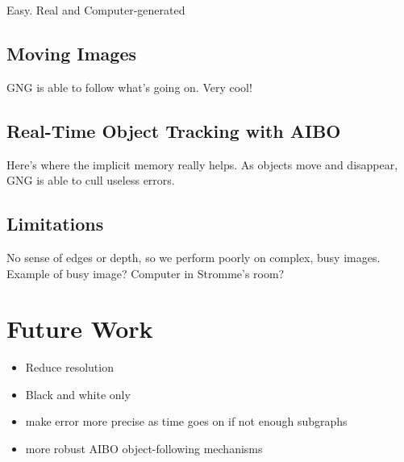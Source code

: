 \documentclass{article}
\renewcommand{\|}{\origbar} %
\begin{document}
Easy. Real and Computer-generated

\subsection{Moving Images}

GNG is able to follow what's going on. Very cool!

\subsection{Real-Time Object Tracking with AIBO}

Here's where the implicit memory really helps. As objects move and disappear, GNG is able to cull useless errors.

\subsection{Limitations}

No sense of edges or depth, so we perform poorly on complex, busy images. Example of busy image? Computer in Stromme's room?

\section{Future Work}

\begin{itemize}
  \item Reduce resolution
  \item Black and white only
  \item make error more precise as time goes on if not enough subgraphs
  \item more robust AIBO object-following mechanisms
\end{itemize}
\end{document}
